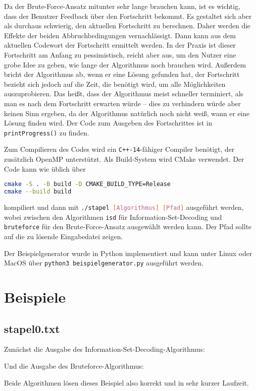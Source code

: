 \documentclass[a4paper,10pt,ngerman]{scrartcl}
\begin{document}
Da der Brute-Force-Ansatz mitunter sehr lange brauchen kann, ist es wichtig, dass der Benutzer Feedback über den Fortschritt bekommt. 
Es gestaltet sich aber als durchaus schwierig, den aktuellen Fortschritt zu berechnen. 
Daher werden die Effekte der beiden Abbruchbedingungen vernachlässigt. 
Dann kann aus dem aktuellen Codewort der Fortschritt ermittelt werden.
In der Praxis ist dieser Fortschritt am Anfang zu pessimistisch, reicht aber aus, um den Nutzer eine grobe Idee zu geben, wie lange der Algorithmus noch brauchen wird. 
Außerdem bricht der Algorithmus ab, wenn er eine Lösung gefunden hat, der Fortschritt bezieht sich jedoch auf die Zeit, die benötigt wird, um alle Möglichkeiten auszuprobieren. 
Das heißt, dass der Algorithmus meist schneller terminiert, als man es nach dem Fortschritt erwarten würde -- dies zu verhindern würde aber keinen Sinn ergeben, da der Algorithmus natürlich noch nicht weiß, wann er eine Lösung finden wird. 
Der Code zum Ausgeben des Fortschrittes ist in \lstinline{printProgress()} zu finden.

Zum Compilieren des Codes wird ein \lstinline{C++-14}-fähiger Compiler benötigt, der zusätzlich OpenMP unterstützt.
Als Build-System wird CMake verwendet. 
Der Code kann wie üblich über 
\begin{lstlisting}[language=bash]
cmake -S . -B build -D CMAKE_BUILD_TYPE=Release
cmake --build build
\end{lstlisting}
kompiliert und dann mit \lstinline[language=bash]{./stapel [Algorithmus] [Pfad]} ausgeführt werden, wobei zwischen den Algorithmen \lstinline{isd} für Information-Set-Decoding und \lstinline{bruteforce} für den Brute-Force-Ansatz ausgewählt werden kann. Der Pfad sollte auf die zu lösende Eingabedatei zeigen. 

Der Beispielgenerator wurde in Python implementiert und kann unter Linux oder MacOS über \lstinline[language=bash]{python3 beispielgenerator.py} ausgeführt werden.
\section{Beispiele}
\subsection*{stapel0.txt}
Zunächst die Ausgabe des Information-Set-Decoding-Algorithmus: 

Und die Ausgabe des Bruteforce-Algorithmus:

Beide Algorithmen lösen dieses Beispiel also korrekt und in sehr kurzer Laufzeit.
\end{document}
